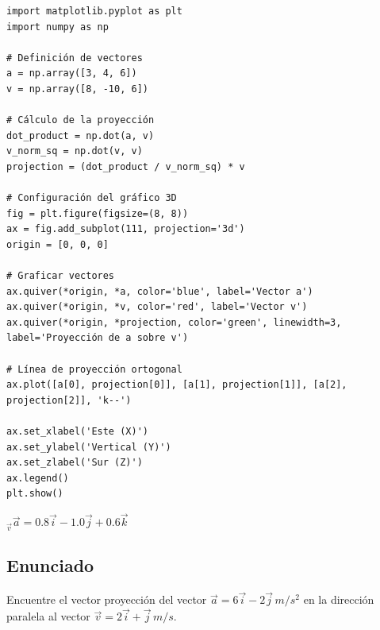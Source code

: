 \documentclass[12pt, a4paper]{article}
\begin{document}
\begin{lstlisting}
import matplotlib.pyplot as plt
import numpy as np

# Definición de vectores
a = np.array([3, 4, 6])
v = np.array([8, -10, 6])

# Cálculo de la proyección
dot_product = np.dot(a, v)
v_norm_sq = np.dot(v, v)
projection = (dot_product / v_norm_sq) * v

# Configuración del gráfico 3D
fig = plt.figure(figsize=(8, 8))
ax = fig.add_subplot(111, projection='3d')
origin = [0, 0, 0]

# Graficar vectores
ax.quiver(*origin, *a, color='blue', label='Vector a')
ax.quiver(*origin, *v, color='red', label='Vector v')
ax.quiver(*origin, *projection, color='green', linewidth=3, label='Proyección de a sobre v')

# Línea de proyección ortogonal
ax.plot([a[0], projection[0]], [a[1], projection[1]], [a[2], projection[2]], 'k--')

ax.set_xlabel('Este (X)')
ax.set_ylabel('Vertical (Y)')
ax.set_zlabel('Sur (Z)')
ax.legend()
plt.show()
\end{lstlisting}

\begin{tcolorbox}[colback=green!5!white, colframe=green!50!black, title=Respuesta Final]
\centering \Large $\text{}_{\vec{v}} \vec{a} = 0.8\vec{i} - 1.0\vec{j} + 0.6\vec{k}$
\end{tcolorbox}

\newpage

\subsection*{Enunciado}
Encuentre el vector proyección del vector $\vec{a} = 6\vec{i} - 2\vec{j} \, \si{m/s^2}$ en la dirección paralela al vector $\vec{v} = 2\vec{i} + \vec{j} \, \si{m/s}$.

\begin{center}
\end{center}
\end{document}
